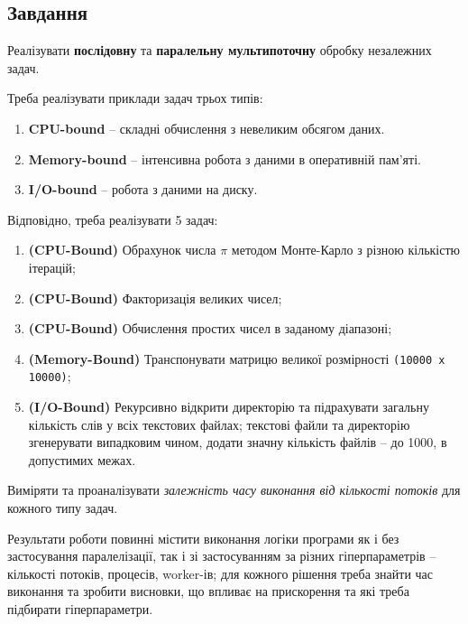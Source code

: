 \documentclass[14pt, a4paper]{extreport}
\begin{document}
	\subsection*{Завдання}
	Реалізувати \textbf{послідовну} та \textbf{паралельну мультипоточну} обробку незалежних задач. 
	
	Треба реалізувати приклади задач трьох типів:
	
	\begin{enumerate}
		\item \textbf{CPU-bound} -- складні обчислення з невеликим обсягом даних.
		
		\item \textbf{Memory-bound} -- інтенсивна робота з даними в оперативній пам'яті.
		
		\item \textbf{I/O-bound} -- робота з даними на диску.
	\end{enumerate}
	
	Відповідно, треба реалізувати 5 задач:
	
	\begin{enumerate}
		\item \textbf{(CPU-Bound)} Обрахунок числа $\pi$ методом Монте-Карло з різною кількістю ітерацій;
		
		\item \textbf{(CPU-Bound)} Факторизація великих чисел;
		
		\item \textbf{(CPU-Bound)} Обчислення простих чисел в заданому діапазоні;
		
		\item \textbf{(Memory-Bound)} Транспонувати матрицю великої розмірності \texttt{(10000 х 10000)};
		
		\item \textbf{(I/O-Bound)} Рекурсивно відкрити директорію та підрахувати загальну кількість слів у всіх текстових файлах; текстові файли та директорію згенерувати випадковим чином, додати значну кількість файлів -- до 1000, в допустимих межах.
	\end{enumerate}
	
	Виміряти та проаналізувати \textit{залежність часу виконання від кількості потоків} для кожного типу задач.
	
	Результати роботи повинні містити виконання логіки програми як і без застосування паралелізації, так і зі застосуванням за різних гіперпараметрів -- кількості потоків, процесів,
	worker-ів; для кожного рішення треба знайти час виконання та зробити висновки, що впливає на прискорення та які треба підбирати гіперпараметри.
	
\end{document}
